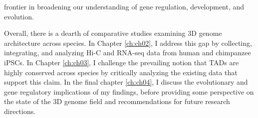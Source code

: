 frontier in broadening our understanding of gene regulation, development, and evolution.

Overall, there is a dearth of comparative studies examining 3D genome architecture across species. In Chapter \ref{ch:ch02}, I address this gap by collecting, integrating, and analyzing Hi-C and RNA-seq data from human and chimpanzee iPSCs. In Chapter \ref{ch:ch03}, I challenge the prevailing notion that TADs are highly conserved across species by critically analyzing the existing data that support this claim. In the final chapter \ref{ch:ch04}, I discuss the evolutionary and gene regulatory implications of my findings, before providing some perspective on the state of the 3D genome field and recommendations for future research directions.